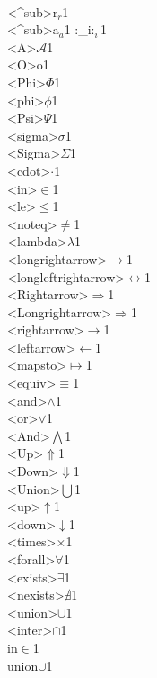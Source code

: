 {  {\\<^sub>r}{{$_r$}}1
  {\\<^sub>a}{{$_a$}}1
  {:_i}{{$:_i$}}1
  {\\<A>}{{$\mathcal{A}$}}1
  {\\<O>}{{\sf o}}1
  {\\<Phi>}{{$\Phi$}}1
  {\\<phi>}{{$\phi$}}1
  {\\<Psi>}{{$\Psi$}}1
  {\\<sigma>}{{$\sigma$}}1
  {\\<Sigma>}{{$\Sigma$}}1
  {\\<cdot>}{{$\cdot$}}1
  {\\<in>}{{$\in$}}1
  {\\<le>}{{$\le$}}1
  {\\<noteq>}{{$\ne$}}1
  {\\<lambda>}{{$\lambda$}}1
  {\\<longrightarrow>}{{$\longrightarrow$}}1
  {\\<longleftrightarrow>}{{$\longleftrightarrow$}}1
  {\\<Rightarrow>}{{$\Rightarrow$}}1
  {\\<Longrightarrow>}{{$\Longrightarrow$}}1
  {\\<rightarrow>}{{$\rightarrow$}}1
  {\\<leftarrow>}{{$\leftarrow$}}1
  {\\<mapsto>}{{$\mapsto$}}1
  {\\<equiv>}{{$\equiv$}}1
  {\\<and>}{{$\wedge$}}1
  {\\<or>}{{$\vee$}}1
  {\\<And>}{{$\bigwedge$}}1
  {\\<Up>}{{$\Uparrow$}}1
  {\\<Down>}{{$\Downarrow$}}1
  {\\<Union>}{{$\bigcup$}}1
  {\\<up>}{{$\uparrow$}}1
  {\\<down>}{{$\downarrow$}}1
  {\\<times>}{{$\times$}}1
  {\\<forall>}{{$\forall$}}1
  {\\<exists>}{{$\exists$}}1
  {\\<nexists>}{{$\nexists$}}1
  {\\<union>}{{$\cup$}}1
  {\\<inter>}{{$\cap$}}1
  {\\in}{$\in$}1
  {\\union}{{$\cup$}}1
}
